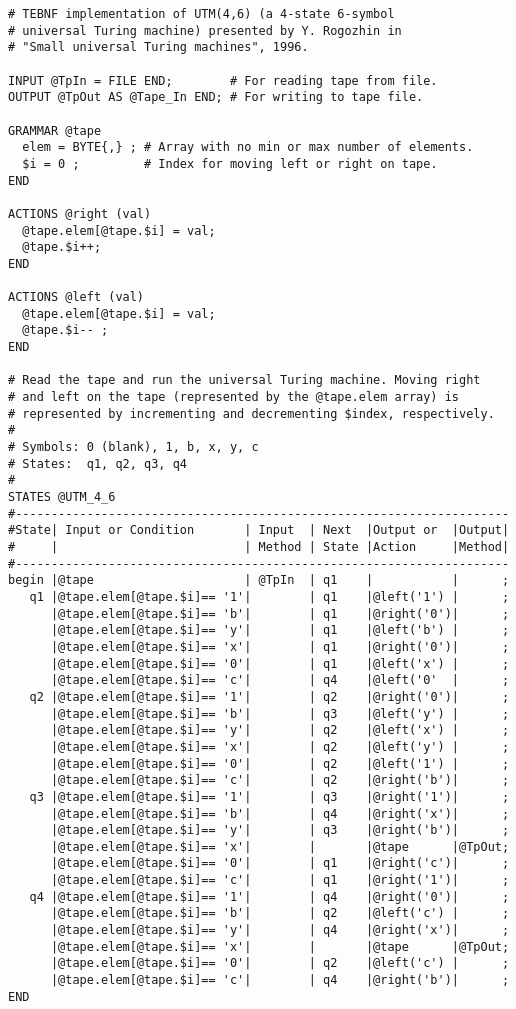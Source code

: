 \begin{lstlisting}[basicstyle=\small,caption={Rogozhin's UTM(4,6) implemented in TEBNF.},label=ExampleUTM46]
# TEBNF implementation of UTM(4,6) (a 4-state 6-symbol
# universal Turing machine) presented by Y. Rogozhin in
# "Small universal Turing machines", 1996.

INPUT @TpIn = FILE END;        # For reading tape from file.
OUTPUT @TpOut AS @Tape_In END; # For writing to tape file.

GRAMMAR @tape
  elem = BYTE{,} ; # Array with no min or max number of elements.
  $i = 0 ;         # Index for moving left or right on tape.
END

ACTIONS @right (val)
  @tape.elem[@tape.$i] = val;
  @tape.$i++;
END

ACTIONS @left (val)
  @tape.elem[@tape.$i] = val;
  @tape.$i-- ;
END

# Read the tape and run the universal Turing machine. Moving right
# and left on the tape (represented by the @tape.elem array) is
# represented by incrementing and decrementing $index, respectively.
#
# Symbols: 0 (blank), 1, b, x, y, c
# States:  q1, q2, q3, q4
#
STATES @UTM_4_6
#---------------------------------------------------------------------
#State| Input or Condition       | Input  | Next  |Output or  |Output|
#     |                          | Method | State |Action     |Method|
#---------------------------------------------------------------------
begin |@tape                     | @TpIn  | q1    |           |      ;
   q1 |@tape.elem[@tape.$i]== '1'|        | q1    |@left('1') |      ;
      |@tape.elem[@tape.$i]== 'b'|        | q1    |@right('0')|      ;
      |@tape.elem[@tape.$i]== 'y'|        | q1    |@left('b') |      ;
      |@tape.elem[@tape.$i]== 'x'|        | q1    |@right('0')|      ;
      |@tape.elem[@tape.$i]== '0'|        | q1    |@left('x') |      ;
      |@tape.elem[@tape.$i]== 'c'|        | q4    |@left('0'  |      ;
   q2 |@tape.elem[@tape.$i]== '1'|        | q2    |@right('0')|      ;
      |@tape.elem[@tape.$i]== 'b'|        | q3    |@left('y') |      ;
      |@tape.elem[@tape.$i]== 'y'|        | q2    |@left('x') |      ;
      |@tape.elem[@tape.$i]== 'x'|        | q2    |@left('y') |      ;
      |@tape.elem[@tape.$i]== '0'|        | q2    |@left('1') |      ;
      |@tape.elem[@tape.$i]== 'c'|        | q2    |@right('b')|      ;
   q3 |@tape.elem[@tape.$i]== '1'|        | q3    |@right('1')|      ;
      |@tape.elem[@tape.$i]== 'b'|        | q4    |@right('x')|      ;
      |@tape.elem[@tape.$i]== 'y'|        | q3    |@right('b')|      ;
      |@tape.elem[@tape.$i]== 'x'|        |       |@tape      |@TpOut;
      |@tape.elem[@tape.$i]== '0'|        | q1    |@right('c')|      ;
      |@tape.elem[@tape.$i]== 'c'|        | q1    |@right('1')|      ;
   q4 |@tape.elem[@tape.$i]== '1'|        | q4    |@right('0')|      ;
      |@tape.elem[@tape.$i]== 'b'|        | q2    |@left('c') |      ;
      |@tape.elem[@tape.$i]== 'y'|        | q4    |@right('x')|      ;
      |@tape.elem[@tape.$i]== 'x'|        |       |@tape      |@TpOut;
      |@tape.elem[@tape.$i]== '0'|        | q2    |@left('c') |      ;
      |@tape.elem[@tape.$i]== 'c'|        | q4    |@right('b')|      ;
END
\end{lstlisting}


